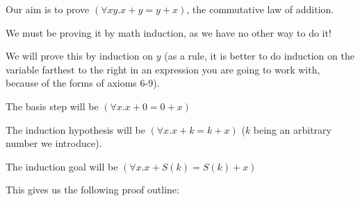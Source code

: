 \documentclass[12pt]{article}
\begin{document}
Our aim is to prove $(\forall xy.x+y=y+x)$, the commutative law of addition.

We must be proving it by math induction, as we have no other way to do it!

We will prove this by induction on $y$ (as a rule, it is better to do induction on the variable farthest to the right
in an expression you are going to work with, because of the forms of axioms 6-9).

The basis step will be $(\forall x.x+0=0+x)$

The induction hypothesis will be $(\forall x.x+k=k+x)$ ($k$ being an arbitrary number we introduce).

The induction goal will be $(\forall x.x+S(k)=S(k)+x)$

This gives us the following proof outline:
\end{document}

